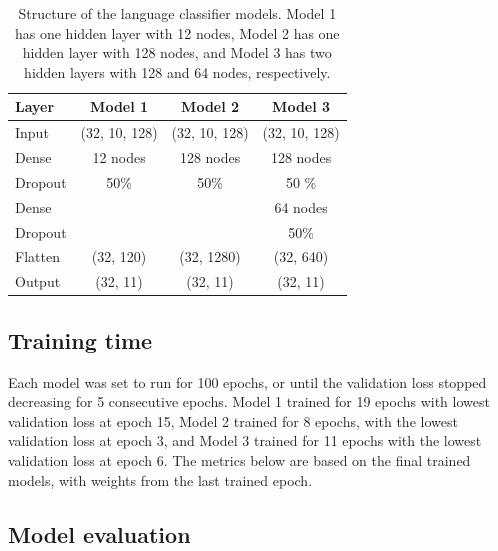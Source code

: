 \documentclass[11pt, letterpaper]{article}
\begin{document}
\begin{table}[!h]
\begin{center}
\caption{Structure of the language classifier models. Model 1 has one hidden layer with 12 nodes, Model 2 has one hidden layer with 128 nodes, and Model 3 has two hidden layers with 128 and 64 nodes, respectively.}
\begin{tabular}{l | c |c  | c |}

Layer  & Model 1 & Model 2 & Model 3\\
\hline

Input 	& (32, 10, 128)& (32, 10, 128) & (32, 10, 128) \\ \hline

Dense	& 12 nodes 	& 128 nodes 	& 128 nodes \\
Dropout	& 50\%		& 50\%		& 50 \% \\ \hline

Dense	&			&			& 64 nodes \\
Dropout	&			& 			& 50\% \\ \hline

Flatten 	& (32, 120)	& (32, 1280)	& (32, 640) \\ \hline
Output 	& (32, 11)		& (32, 11)		& (32, 11)\\
\hline
\end{tabular}

\label{tab:LangModels}
\end{center}
\end{table}

\subsection{Training time}

Each model was set to run for 100 epochs, or until the validation loss stopped decreasing for 5 consecutive epochs. Model 1 trained for 19 epochs with lowest validation loss at epoch 15, %
Model 2 trained for 8 epochs, with the lowest validation loss at epoch 3, and %
Model 3 trained for 11 epochs with the lowest validation loss at epoch 6.%
The metrics below are based on the final trained models, with weights from the last trained epoch. %

\subsection{Model evaluation}
\end{document}
